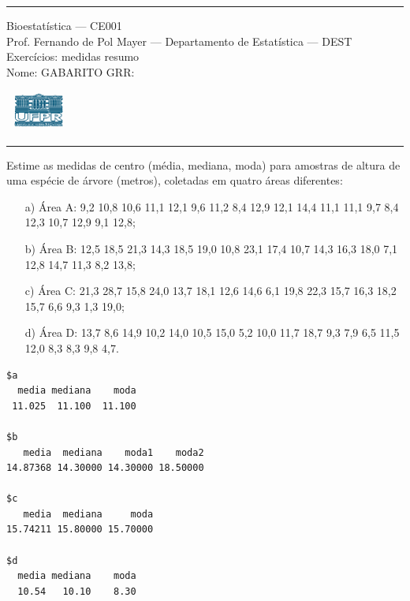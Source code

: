 \documentclass[a4paper,11pt,fleqn]{article}\usepackage[]{graphicx}\usepackage[]{color}
\makeatletter
\newenvironment{kframe}{%
 \def\at@end@of@kframe{}%
 \ifinner\ifhmode%
  \def\at@end@of@kframe{\end{minipage}}%
  \begin{minipage}{\columnwidth}%
 \fi\fi%
 \def\FrameCommand##1{\hskip\@totalleftmargin \hskip-\fboxsep
 \colorbox{shadecolor}{##1}\hskip-\fboxsep
     \hskip-\linewidth \hskip-\@totalleftmargin \hskip\columnwidth}%
 \MakeFramed {\advance\hsize-\width
   \@totalleftmargin\z@ \linewidth\hsize
   \@setminipage}}%
 {\par\unskip\endMakeFramed%
 \at@end@of@kframe}
\newenvironment{knitrout}{}{} %
\theoremstyle{definition}
\makeatother
\begin{document}
\reversemarginpar %





\hrule
\vspace{0.3cm}

\begin{minipage}[c]{.85\textwidth}
  Bioestatística --- CE001 \\
  Prof. Fernando de Pol Mayer --- Departamento de Estatística --- DEST \\
  Exercícios: medidas resumo \\
  Nome: GABARITO  \hfill GRR: \hspace{2cm}
\end{minipage}\hfill
\begin{minipage}[c]{.15\textwidth}
\flushright
\includegraphics[width=2.2cm]{../img/ufpr-logo.png}
\end{minipage}

\vspace{0.3cm}
\hrule
\vspace{0.3cm}

\begin{compactenum}[1.]
\item Estime as medidas de centro (média, mediana,
  moda) para amostras de altura de uma espécie de árvore (metros),
  coletadas em quatro áreas diferentes:
  \begin{itemize}
  \item[a)] Área A: 9,2 10,8 10,6 11,1 12,1 9,6 11,2 8,4 12,9 12,1
    14,4 11,1 11,1 9,7 8,4 12,3 10,7 12,9 9,1 12,8;
  \item[b)] Área B: 12,5 18,5 21,3 14,3 18,5 19,0 10,8 23,1 17,4 10,7
    14,3 16,3 18,0 7,1 12,8 14,7 11,3 8,2 13,8;
  \item[c)] Área C: 21,3 28,7 15,8 24,0 13,7 18,1 12,6 14,6 6,1 19,8
    22,3 15,7 16,3 18,2 15,7 6,6 9,3 1,3 19,0;
  \item[d)] Área D: 13,7 8,6 14,9 10,2 14,0 10,5 15,0 5,2 10,0 11,7
    18,7 9,3 7,9 6,5 11,5 12,0 8,3 8,3 9,8 4,7.
  \end{itemize}
\begin{knitrout}\small
{}\color{fgcolor}\begin{kframe}
\begin{verbatim}
$a
  media mediana    moda 
 11.025  11.100  11.100 

$b
   media  mediana    moda1    moda2 
14.87368 14.30000 14.30000 18.50000 

$c
   media  mediana     moda 
15.74211 15.80000 15.70000 

$d
  media mediana    moda 
  10.54   10.10    8.30 
\end{verbatim}
\end{kframe}
\end{knitrout}
\end{compactenum}
\end{document}
